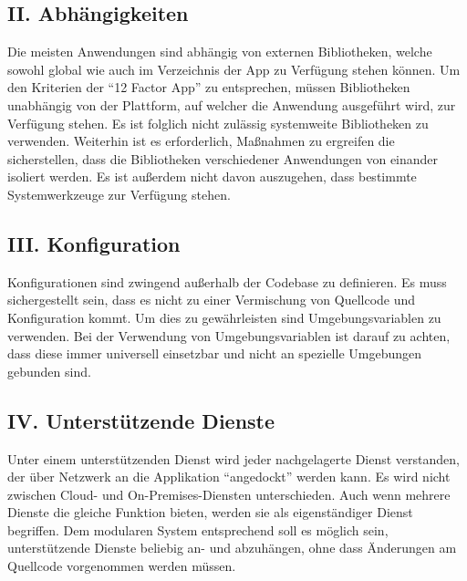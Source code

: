 \documentclass[fleqn,10pt]{SelfArx} %
\begin{document}
\subsection{II. Abhängigkeiten}
Die meisten Anwendungen sind abhängig von externen Bibliotheken, welche sowohl global wie auch im Verzeichnis der App zu Verfügung stehen können. Um den Kriterien der \enquote{12 Factor App} zu entsprechen, müssen Bibliotheken unabhängig von der Plattform, auf welcher die Anwendung ausgeführt wird, zur Verfügung stehen. Es ist folglich nicht zulässig systemweite Bibliotheken zu verwenden. Weiterhin ist es erforderlich, Maßnahmen zu ergreifen die sicherstellen, dass die Bibliotheken verschiedener Anwendungen von einander isoliert werden.\newline
Es ist außerdem nicht davon auszugehen, dass bestimmte Systemwerkzeuge zur Verfügung stehen.
\subsection{III. Konfiguration}
Konfigurationen sind zwingend außerhalb der Codebase zu definieren. Es muss sichergestellt sein, dass es nicht zu einer Vermischung von Quellcode und Konfiguration kommt. Um dies zu gewährleisten sind Umgebungsvariablen zu verwenden. Bei der Verwendung von Umgebungsvariablen ist darauf zu achten, dass diese immer universell einsetzbar und nicht an spezielle Umgebungen gebunden sind.
\subsection{IV. Unterstützende Dienste}
Unter einem unterstützenden Dienst wird jeder nachgelagerte Dienst verstanden, der über Netzwerk an die Applikation \enquote{angedockt} werden kann. Es wird nicht zwischen Cloud- und On-Premises-Diensten unterschieden. Auch wenn mehrere Dienste die gleiche Funktion bieten, werden sie als eigenständiger Dienst begriffen. Dem modularen System entsprechend soll es möglich sein, unterstützende Dienste beliebig an- und abzuhängen, ohne dass Änderungen am Quellcode vorgenommen werden müssen.
\end{document}
